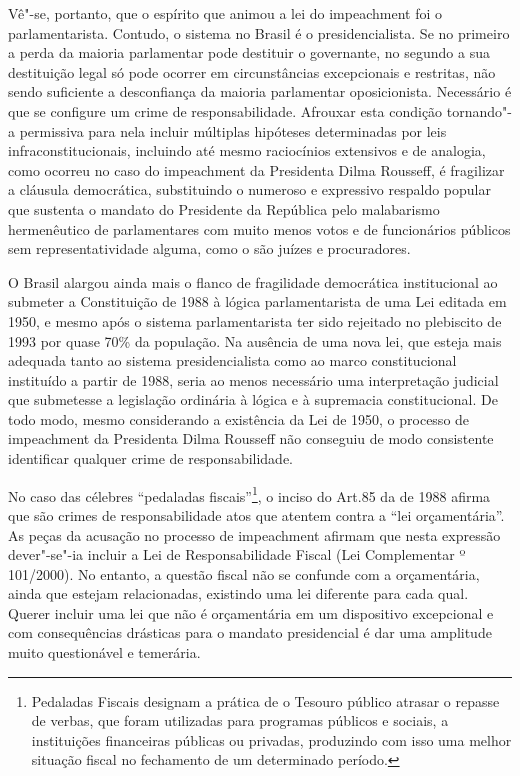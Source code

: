 Vê"-se, portanto, que o espírito que animou a lei do impeachment foi o
parlamentarista. Contudo, o sistema no Brasil é o presidencialista. Se
no primeiro a perda da maioria parlamentar pode destituir o governante,
no segundo a sua destituição legal só pode ocorrer em circunstâncias
excepcionais e restritas, não sendo suficiente a desconfiança da maioria
parlamentar oposicionista. Necessário é que se configure um crime de
responsabilidade. Afrouxar esta condição tornando"-a permissiva para nela
incluir múltiplas hipóteses determinadas por leis infraconstitucionais,
incluindo até mesmo raciocínios extensivos e de analogia, como ocorreu
no caso do impeachment da Presidenta Dilma Rousseff, é fragilizar a
cláusula democrática, substituindo o numeroso e expressivo respaldo
popular que sustenta o mandato do Presidente da República pelo
malabarismo hermenêutico de parlamentares com muito menos votos e de
funcionários públicos sem representatividade alguma, como o são juízes e
procuradores.

O Brasil alargou ainda mais o flanco de fragilidade democrática
institucional ao submeter a Constituição de 1988 à lógica
parlamentarista de uma Lei editada em 1950, e mesmo após o sistema
parlamentarista ter sido rejeitado no plebiscito de 1993 por quase 70\%
da população. Na ausência de uma nova lei, que esteja mais adequada
tanto ao sistema presidencialista como ao marco constitucional
instituído a partir de 1988, seria ao menos necessário uma interpretação
judicial que submetesse a legislação ordinária à lógica e à supremacia
constitucional. De todo modo, mesmo considerando a existência da Lei de
1950, o processo de impeachment da Presidenta Dilma Rousseff não
conseguiu de modo consistente identificar qualquer crime de
responsabilidade.

No caso das célebres ``pedaladas fiscais''\footnote{Pedaladas Fiscais
  designam a prática de o Tesouro público atrasar o repasse de verbas,
  que foram utilizadas para programas públicos e sociais, a instituições
  financeiras públicas ou privadas, produzindo com isso uma melhor
  situação fiscal no fechamento de um determinado período.}, o inciso 
do Art.85 da  de 1988 afirma que são crimes de responsabilidade atos
que atentem contra a ``lei orçamentária''. As peças da acusação no
processo de impeachment afirmam que nesta expressão dever"-se"-ia incluir
a Lei de Responsabilidade Fiscal (Lei Complementar º 101/2000). No
entanto, a questão fiscal não se confunde com a orçamentária, ainda que
estejam relacionadas, existindo uma lei diferente para cada qual. Querer
incluir uma lei que não é orçamentária em um dispositivo excepcional e
com consequências drásticas para o mandato presidencial é dar uma
amplitude muito questionável e temerária.

